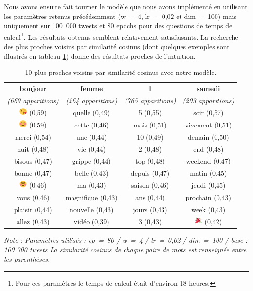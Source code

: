 \documentclass[11pt,french,french]{article}
\let\rmarkdownfootnote\footnote%
\def\footnote{\protect\rmarkdownfootnote}
\begin{document}
Nous avons ensuite fait tourner le modèle que nous avons implémenté en utilisant les paramètres retenus précédemment (w~=~4, lr~=~0,02 et dim~=~100) mais uniquement sur 100~000 tweets et 80 epochs pour des questions de temps de calcul\footnote{Pour ces paramètres le temps de calcul était d'environ 18 heures.}.
Les résultats obtenus semblent relativement satisfaisants. La recherche des plus proches voisins par similarité cosinus (dont quelques exemples sont illustrés en tableau \ref{table:knn_ark}) donne des résultats proches de l'intuition.

\begin{table}[!h]
\begin{center}
\begin{tabular}{|c|c|c|c|}
    \hline
\textbf{bonjour} & \textbf{femme} & \textbf{1} & \textbf{samedi} \tabularnewline
\emph{(669 apparitions)} & \emph{(264 apparitions)} & \emph{(765 apparitions)} & \emph{(203 apparitions)} \tabularnewline
       \hline
\includegraphics[height=4mm]{img/emojis/1.png} (0,59) & quelle (0,49) & 5 (0,55) & soir (0,57) \tabularnewline
\includegraphics[height=4mm]{img/emojis/2.png} (0,59) & cette (0,46) & mois (0,51) & vivement (0,51) \tabularnewline
merci (0,54) & une (0,44) & 10 (0,49) & demain (0,50) \tabularnewline
nuit (0,48) & vie (0,44) & 2 (0,48) & end (0,48) \tabularnewline
bisous (0,47) & grippe (0,44) & top (0,48) & weekend (0,47) \tabularnewline
bonne (0,47) & belle (0,43) & depuis (0,47) & matin (0,45) \tabularnewline
\includegraphics[height=4mm]{img/emojis/3.png} (0,46) & ma (0,43) & saison (0,46) & jeudi (0,45) \tabularnewline
vous (0,46) & magnifique (0,43) & ans (0,44) & prochain (0,43) \tabularnewline
plaisir (0,44) & nouvelle (0,43) & jours (0,43) & week (0,43) \tabularnewline
allez (0,43) & vidéo (0,39) & 3 (0,43) & \includegraphics[height=4mm]{img/emojis/4.png} (0,42) \tabularnewline
    \hline
 \end{tabular}
\captionsetup{margin=0cm,format=hang,justification=justified}
\caption{10 plus proches voisins par similarité cosinus avec \og notre \fg{} modèle.}\label{table:knn_ark}
\end{center}
\vspace{-0.3cm}
\footnotesize
\emph{Note : Paramètres utilisés : ep = 80 / w = 4 / lr = 0,02 / dim = 100 / base : 100 000 tweets\newline
La similarité cosinus de chaque paire de mots est renseignée entre les parenthèses.}

\end{table}
\end{document}
